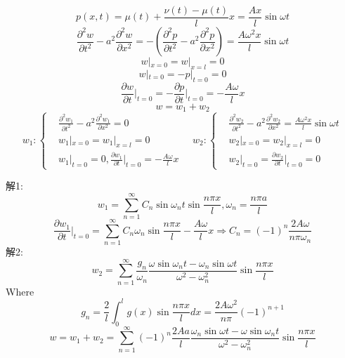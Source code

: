 $$p(x,t)=\mu(t)+\frac{\nu(t)-\mu(t)}{l}x=\frac{Ax}{l}\sin\omega t$$
$$\frac{\partial^2{w}}{\partial{t}^2}-a^2\frac{\partial^2{w}}{\partial{x}^2}=-\left(\frac{\partial^2{p}}{\partial{t}^2}-a^2\frac{\partial^2{p}}{\partial{x}^2}\right)=\frac{A\omega^2x}{l}\sin\omega t$$
$$w|_{x=0}=w|_{x=l}=0$$
$$w|_{t=0}=-p|_{t=0}=0$$
$$\frac{\partial{w}}{\partial t}\bigg|_{t=0}=-\frac{\partial{p}}{\partial t}\bigg|_{t=0}=-\frac{A\omega}{l}x$$ 
$$w=w_1+w_2$$
$$w_1:\left\{
\begin{aligned}
&
\frac{\partial^2{w_1}}{\partial{t}^2}-a^2\frac{\partial^2{w_1}}{\partial{x}^2}=0\\
&w_1|_{x=0}=w_1|_{x=l}=0\\
&w_1|_{t=0}=0,\frac{\partial{w_1}}{\partial t}\bigg|_{t=0}=-\frac{A\omega}{l}x
    \end{aligned}
\right.\quad w_2:\left\{
\begin{aligned}
&
\frac{\partial^2{w_2}}{\partial{t}^2}-a^2\frac{\partial^2{w_2}}{\partial{x}^2}=\frac{A\omega^2x}{l}\sin\omega t\\
&w_2|_{x=0}=w_2|_{x=l}=0\\
&w_2|_{t=0}=\frac{\partial{w_2}}{\partial t}\bigg|_{t=0}=0
    \end{aligned}
\right.$$

\noindent 解1:
$$w_1=\sum_{n=1}^\infty C_n\sin\omega_nt\sin\frac{n\pi x}{l}, \omega_n=\frac{n\pi a}{l}$$
$$\frac{\partial{w_1}}{\partial t}\bigg|_{t=0}=\sum_{n=1}^\infty C_n\omega_n\sin\frac{n\pi x}{l}-\frac{A\omega}{l}x\Rightarrow C_n=(-1)^n\frac{2A\omega}{n\pi\omega_n}$$
\noindent 解2:
$$w_2=\sum^\infty_{n=1}\frac{g_n}{\omega_n}\frac{\omega\sin{\omega_nt}-\omega_n\sin\omega t}{\omega^2-\omega_n^2}\sin\frac{n\pi x}{l}$$
Where $$g_n=\frac{2}{l}\int_0^lg(x)\sin\frac{n\pi x}{l}dx=\frac{2A\omega^2}{n\pi}(-1)^{n+1}$$
$$w=w_1+w_2=\sum_{n=1}^\infty(-1)^{n}\frac{2Aa}{l}\frac{\omega_n\sin\omega t-\omega\sin\omega_nt}{\omega^2-\omega_n^2}\sin\frac{n\pi x}{l}$$


